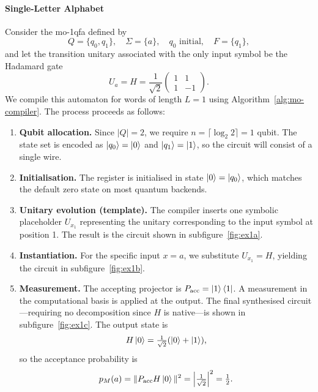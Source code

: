 \paragraph{Single-Letter Alphabet}
\label{ex:moqfa-single-letter}
Consider the \gls{mo-1qfa} defined by
\[
Q = \{q_0, q_1\}, \quad \Sigma = \{a\}, \quad q_0 \text{ initial}, \quad F = \{q_1\},
\]
and let the transition unitary associated with the only input symbol be the Hadamard gate
\[
U_a = H = \frac{1}{\sqrt{2}}
\begin{pmatrix}
1 & 1 \\
1 & -1
\end{pmatrix}.
\]
We compile this automaton for words of length $L = 1$ using Algorithm~\ref{alg:mo-compiler}. The process proceeds as follows:

\begin{enumerate}
\item \textbf{Qubit allocation.} Since $|Q| = 2$, we require $n = \lceil \log_2 2 \rceil = 1$ qubit. The state set is encoded as $\ket{q_0} = \ket{0}$ and $\ket{q_1} = \ket{1}$, so the circuit will consist of a single wire.

\item \textbf{Initialisation.} The register is initialised in state $\ket{0} = \ket{q_0}$, which matches the default zero state on most quantum backends.

\item \textbf{Unitary evolution (template).} The compiler inserts one symbolic placeholder $\boxed{U_{x_1}}$ representing the unitary corresponding to the input symbol at position 1. The result is the circuit shown in subfigure~\ref{fig:ex1a}.

\item \textbf{Instantiation.} For the specific input $x = a$, we substitute $U_{x_1} = H$, yielding the circuit in subfigure~\ref{fig:ex1b}.

\item \textbf{Measurement.} The accepting projector is $P_{\text{acc}} = \ket{1}\bra{1}$. A measurement in the computational basis is applied at the output. The final synthesised circuit—requiring no decomposition since $H$ is native—is shown in subfigure~\ref{fig:ex1c}. The output state is
\[
H\ket{0} = \tfrac{1}{\sqrt{2}}(\ket{0} + \ket{1}),
\]
so the acceptance probability is
\[
p_M(a) = \|P_{\text{acc}} H \ket{0}\|^2 = \left|\tfrac{1}{\sqrt{2}}\right|^2 = \tfrac{1}{2}.
\]
\end{enumerate}\vspace{1em}
